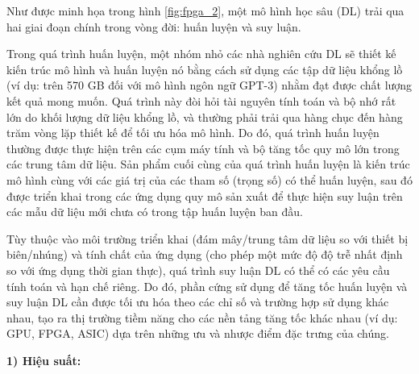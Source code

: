 \documentclass[a4paper]{article}
\begin{document}
Như được minh họa trong hình \ref{fig:fpga_2}, một mô hình học sâu (DL) trải qua hai giai đoạn chính trong vòng đời: huấn luyện và suy luận.

Trong quá trình huấn luyện, một nhóm nhỏ các nhà nghiên cứu DL sẽ thiết kế kiến trúc mô hình và huấn luyện nó bằng cách sử dụng các tập dữ liệu khổng lồ (ví dụ: trên 570 GB đối với mô hình ngôn ngữ GPT-3) nhằm đạt được chất lượng kết quả mong muốn. Quá trình này đòi hỏi tài nguyên tính toán và bộ nhớ rất lớn do khối lượng dữ liệu khổng lồ, và thường phải trải qua hàng chục đến hàng trăm vòng lặp thiết kế để tối ưu hóa mô hình. Do đó, quá trình huấn luyện thường được thực hiện trên các cụm máy tính và bộ tăng tốc quy mô lớn trong các trung tâm dữ liệu. Sản phẩm cuối cùng của quá trình huấn luyện là kiến trúc mô hình cùng với các giá trị của các tham số (trọng số) có thể huấn luyện, sau đó được triển khai trong các ứng dụng quy mô sản xuất để thực hiện suy luận trên các mẫu dữ liệu mới chưa có trong tập huấn luyện ban đầu.

Tùy thuộc vào môi trường triển khai (đám mây/trung tâm dữ liệu so với thiết bị biên/nhúng) và tính chất của ứng dụng (cho phép một mức độ độ trễ nhất định so với ứng dụng thời gian thực), quá trình suy luận DL có thể có các yêu cầu tính toán và hạn chế riêng. Do đó, phần cứng sử dụng để tăng tốc huấn luyện và suy luận DL cần được tối ưu hóa theo các chỉ số và trường hợp sử dụng khác nhau, tạo ra thị trường tiềm năng cho các nền tảng tăng tốc khác nhau (ví dụ: GPU, FPGA, ASIC) dựa trên những ưu và nhược điểm đặc trưng của chúng.

\textbf{1) Hiệu suất:}
\end{document}
